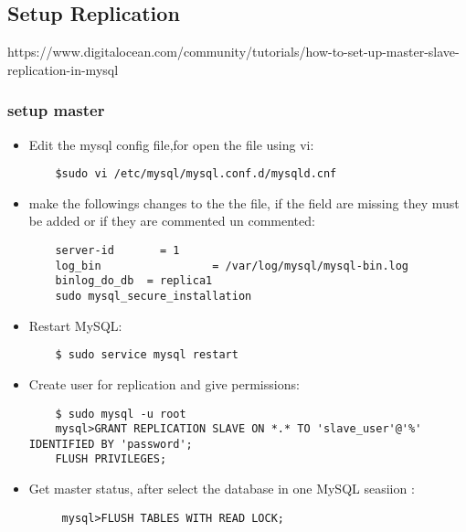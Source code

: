 \subsection{Setup Replication}
\label{appendix:SetupReplication}

https://www.digitalocean.com/community/tutorials/how-to-set-up-master-slave-replication-in-mysql

\subsubsection{setup master}

\begin{itemize}
	
	
	\item Edit the mysql config file,for open the file using vi:
	
	\begin{verbatim}
	$sudo vi /etc/mysql/mysql.conf.d/mysqld.cnf
	\end{verbatim}
	\item make the followings changes to the the file, if the field are missing they must be added or if they are commented un commented:
	\begin{verbatim}
	server-id       = 1
	log_bin                 = /var/log/mysql/mysql-bin.log
	binlog_do_db  = replica1
	sudo mysql_secure_installation
	\end{verbatim}
	
	\item Restart MySQL:
		\begin{verbatim}
	$ sudo service mysql restart
	\end{verbatim}
	
	\item Create user for replication and give permissions:
		\begin{verbatim}
	$ sudo mysql -u root
	mysql>GRANT REPLICATION SLAVE ON *.* TO 'slave_user'@'%' IDENTIFIED BY 'password';
	FLUSH PRIVILEGES;
	\end{verbatim}
	
	\item Get master status, after select the database in one MySQL seasiion :
			\begin{verbatim}
	 mysql>FLUSH TABLES WITH READ LOCK;
	\end{verbatim}
	

\end{itemize}
